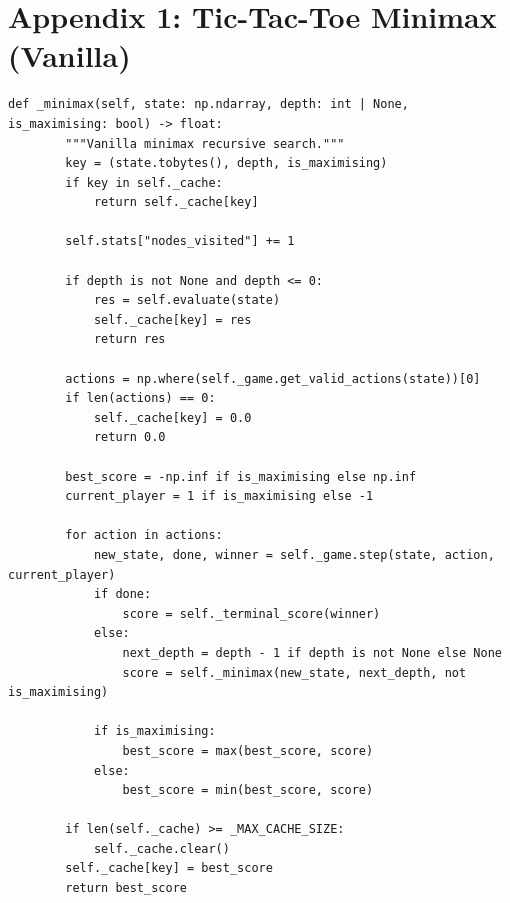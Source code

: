 
\section{Appendix 1: Tic-Tac-Toe Minimax (Vanilla)}
{\small
\begin{lstlisting}[style=mypython]
    def _minimax(self, state: np.ndarray, depth: int | None, is_maximising: bool) -> float:
        """Vanilla minimax recursive search."""
        key = (state.tobytes(), depth, is_maximising)
        if key in self._cache:
            return self._cache[key]
            
        self.stats["nodes_visited"] += 1

        if depth is not None and depth <= 0:
            res = self.evaluate(state)
            self._cache[key] = res
            return res

        actions = np.where(self._game.get_valid_actions(state))[0]
        if len(actions) == 0:
            self._cache[key] = 0.0
            return 0.0

        best_score = -np.inf if is_maximising else np.inf
        current_player = 1 if is_maximising else -1
        
        for action in actions:
            new_state, done, winner = self._game.step(state, action, current_player)
            if done:
                score = self._terminal_score(winner)
            else:
                next_depth = depth - 1 if depth is not None else None
                score = self._minimax(new_state, next_depth, not is_maximising)
            
            if is_maximising:
                best_score = max(best_score, score)
            else:
                best_score = min(best_score, score)
                
        if len(self._cache) >= _MAX_CACHE_SIZE:
            self._cache.clear()
        self._cache[key] = best_score
        return best_score
\end{lstlisting}
}

